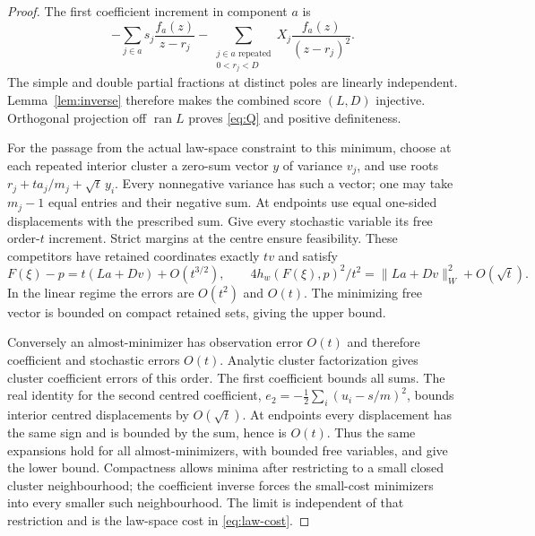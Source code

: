 \documentclass[11pt,reqno]{amsart}
\numberwithin{equation}{section}
\theoremstyle{definition}
\theoremstyle{remark}
\begin{document}
\begin{proof}
The first coefficient increment in component $a$ is
\[
 -\sum_{j\in a}s_j\frac{f_a(z)}{z-r_j}
 -\sum_{\substack{j\in a\text{ repeated}\\0<r_j<D}}
                X_j\frac{f_a(z)}{(z-r_j)^2}.
\]
The simple and double partial fractions at distinct poles are linearly independent. Lemma~\ref{lem:inverse} therefore makes the combined score $(L,D)$ injective. Orthogonal projection off $\operatorname{ran}L$ proves \eqref{eq:Q} and positive definiteness.

For the passage from the actual law-space constraint to this minimum, choose at each repeated interior cluster a zero-sum vector $y$ of variance $v_j$, and use roots $r_j+ta_j/m_j+\sqrt t\,y_i$. Every nonnegative variance has such a vector; one may take $m_j-1$ equal entries and their negative sum. At endpoints use equal one-sided displacements with the prescribed sum. Give every stochastic variable its free order-$t$ increment. Strict margins at the centre ensure feasibility. These competitors have retained coordinates exactly $tv$ and satisfy
\[
 F(\xi)-p=t(La+Dv)+O(t^{3/2}),\qquad
 4h_w(F(\xi),p)^2/t^2=\|La+Dv\|_W^2+O(\sqrt t).
\]
In the linear regime the errors are $O(t^2)$ and $O(t)$. The minimizing free vector is bounded on compact retained sets, giving the upper bound.

Conversely an almost-minimizer has observation error $O(t)$ and therefore coefficient and stochastic errors $O(t)$. Analytic cluster factorization gives cluster coefficient errors of this order. The first coefficient bounds all sums. The real identity for the second centred coefficient, $e_2=-\frac12\sum_i(u_i-s/m)^2$, bounds interior centred displacements by $O(\sqrt t)$. At endpoints every displacement has the same sign and is bounded by the sum, hence is $O(t)$. Thus the same expansions hold for all almost-minimizers, with bounded free variables, and give the lower bound. Compactness allows minima after restricting to a small closed cluster neighbourhood; the coefficient inverse forces the small-cost minimizers into every smaller such neighbourhood. The limit is independent of that restriction and is the law-space cost in \eqref{eq:law-cost}.


\end{proof}
\end{document}
